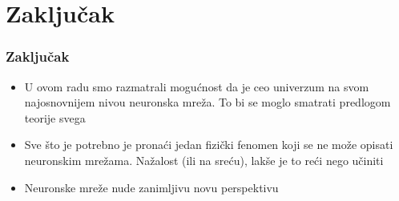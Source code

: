 \documentclass{beamer}
\begin{document}
\section{Zaključak}
    \begin{frame}[fragile]\frametitle{Zaključak}
	   \begin{itemize}	
            \item  U ovom radu smo razmatrali mogućnost da je ceo univerzum na svom najosnovnijem nivou neuronska mreža. To bi se moglo smatrati predlogom teorije svega
            \item  Sve što je potrebno je pronaći jedan fizički fenomen koji se ne može opisati neuronskim mrežama. Nažalost (ili na sreću), lakše je to reći nego učiniti
		  \item  Neuronske mreže nude zanimljivu novu perspektivu
	   \end{itemize}
    \end{frame}
\end{document}
